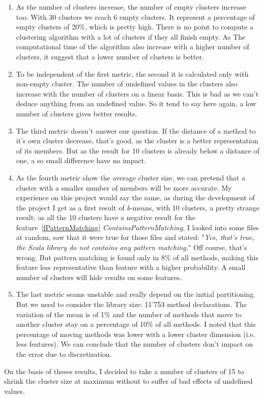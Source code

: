 \documentclass[12pt]{article}
\begin{document}
\begin{enumerate}
\item As the number of clusters increase, the number of empty clusters increase too. With 30 clusters we reach 6 empty clusters. It represent a percentage of empty clusters of 20\%, which is pretty high. There is no point to compute a clustering algorithm with a lot of clusters if they all finish empty. As The computational time of the algorithm also increase with a higher number of clusters, it suggest that a lower number of clusters is better.
\item To be independent of the first metric, the second it is calculated only with non-empty cluster. The number of undefined values in the clusters also increase with the number of clusters on a linear basis. This is bad as we can't deduce anything from an undefined value. So it tend to say here again, a low number of clusters gives better results.
\item The third metric doesn't answer our question. If the distance of a method to it's own cluster decrease, that's good, as the cluster is a better representation of its members. But as the result for 10 clusters is already below a distance of one, a so small difference have no impact.
\item As the fourth metric show the average cluster size, we can pretend that a cluster with a smaller number of members will be more accurate. My experience on this project would say the same, as during the development of the project I get as a first result of \textit{k}-means, with 10 clusters, a pretty strange result: as all the 10 clusters have a negative result for the feature~\ref{fPatternMatching} \textit{ContainsPatternMatching}, I looked into some files at random, saw that it were true for those files and stated: "\textit{Yes, that's true, the Scala library do not contains any pattern matching.}" Off course, that's wrong. But pattern matching is found only in 8\% of all methods, making this feature less representative than feature with a higher probability. A small number of clusters will hide results on some features. %
\item The last metric seams unstable and really depend on the initial partitioning. But we need to consider the library size: 11'753 method declarations. The variation of the mean is of 1\% and the number of methods that move to another cluster stay on a percentage of 10\% of all methods. I noted that this percentage of moving methods was lower with a lower cluster dimension (i.e. less features). We can conclude that the number of clusters don't impact on the error due to discretization.
\end{enumerate}
On the basis of theses results, I decided to take a number of clusters of 15 to shrink the cluster size at maximum without to suffer of bad effects of undefined values.
\end{document}
